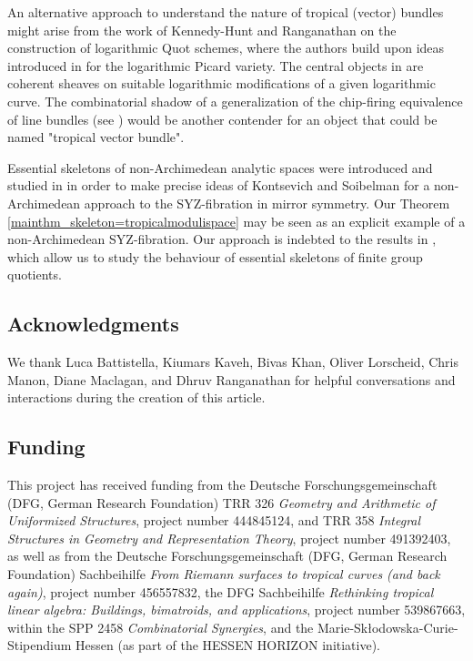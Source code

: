 \documentclass[10pt, a4paper]{amsart}
\theoremstyle{definition}
\theoremstyle{myitemstyle}
\begin{document}
An alternative approach to understand the nature of tropical (vector) bundles might arise from the work of Kennedy-Hunt and Ranganathan \cite{KennedyHuntRanganathan_logQuot} on the construction of logarithmic Quot schemes, where the authors build upon ideas introduced in \cite{MolchoWise} for the logarithmic Picard variety. The central objects in \cite{KennedyHuntRanganathan_logQuot} are coherent sheaves on suitable logarithmic modifications of a given logarithmic curve. The combinatorial shadow of a generalization of the chip-firing equivalence of line bundles (see \cite[Sect. 2 and 3]{BakerJensen}) would be another contender for an object that could be named "tropical vector bundle". 

Essential skeletons of non-Archimedean analytic spaces were introduced and studied in \cite{MustataNicaise,NicaiseXu, NicaiseXuYue} in order to make precise ideas of Kontsevich and Soibelman \cite{KontsevichSoibelman} for a non-Archimedean approach to the SYZ-fibration in mirror symmetry. Our Theorem \ref{mainthm_skeleton=tropicalmodulispace} may be seen as an explicit example of a non-Archimedean SYZ-fibration. Our approach is indebted to the results in \cite{BrownMazzon}, which allow us to study the behaviour of essential skeletons of finite group quotients. 




\subsection*{Acknowledgments} We thank Luca Battistella, Kiumars Kaveh, Bivas Khan, Oliver Lorscheid, Chris Manon, Diane Maclagan, and Dhruv Ranganathan for helpful conversations and interactions during the creation of this article. 

\subsection*{Funding} This project has received funding from the Deutsche Forschungsgemeinschaft (DFG, German Research Foundation) TRR 326 \emph{Geometry and Arithmetic of Uniformized Structures}, project number 444845124, and TRR 358 \emph{Integral Structures in Geometry and Representation Theory}, project number 491392403, as well as from the Deutsche Forschungsgemeinschaft (DFG, German Research Foundation) Sachbeihilfe \emph{From Riemann surfaces to tropical curves (and back again)}, project number 456557832, the DFG Sachbeihilfe \emph{Rethinking tropical linear algebra: Buildings, bimatroids, and applications}, project number 539867663, within the  
SPP 2458 \emph{Combinatorial Synergies}, and the Marie-Sk\l{}odowska-Curie-Stipendium Hessen (as part of the HESSEN HORIZON initiative).
\end{document}

